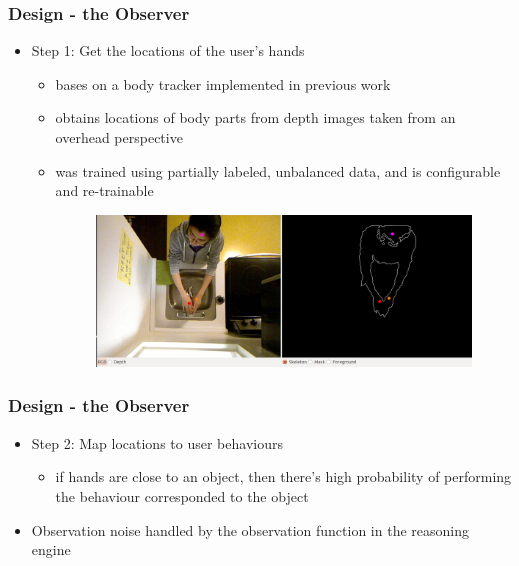 \documentclass{beamer}
\begin{document}
\begin{frame}
\frametitle{Design - the Observer}
\begin{itemize}
\item Step 1: Get the locations of the user's hands
\begin{itemize}
\item bases on a body tracker implemented in previous work
\item obtains locations of body parts from depth images taken from an overhead perspective
\item was trained using partially labeled, unbalanced data, and is configurable and re-trainable
\begin{figure}[htb]
\centering
\includegraphics[width=0.9\linewidth]{fig/handtracker-performance.png}
\end{figure}
\end{itemize}
\end{itemize}
\end{frame}

\begin{frame}
\frametitle{Design - the Observer}
\begin{itemize}
\item Step 2: Map locations to user behaviours
\begin{itemize}
\item if hands are close to an object, then there's high probability of performing the behaviour corresponded to the object
\end{itemize}
\vspace{.3cm}
\item Observation noise handled by the observation function in the reasoning engine
\end{itemize}
\end{frame}
\end{document}
